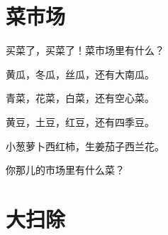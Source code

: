 \documentclass[12pt,UTF-8,openany]{ctexbook}
\begin{document}
\hanzibox{}\hanzibox{}\hanzibox{}\hanzibox{}\hspace{1em}\hanzibox{}\hanzibox{}\hanzibox{}\hanzibox{}






\chapter{菜市场}

\begin{large}
    
    买菜了，买菜了！菜市场里有什么？
    
    黄瓜，冬瓜，丝瓜，还有大南瓜。
    
    青菜，花菜，白菜，还有空心菜。
    
    黄豆，土豆，红豆，还有四季豆。
    
    小葱萝卜西红柿，生姜茄子西兰花。
    
    你那儿的市场里有什么菜？
    
\end{large}


\clearpage

\begin{center}
    
    
\end{center}


\hanzibox{}\hanzibox{}\hanzibox{}\hanzibox{}\hspace{1em}\hanzibox{}\hanzibox{}\hanzibox{}\hanzibox{}

\hanzibox{}\hanzibox{}\hanzibox{}\hanzibox{}\hspace{1em}\hanzibox{}\hanzibox{}\hanzibox{}\hanzibox{}

\hanzibox{}\hanzibox{}\hanzibox{}\hanzibox{}\hspace{1em}\hanzibox{}\hanzibox{}\hanzibox{}\hanzibox{}

\hanzibox{}\hanzibox{}\hanzibox{}\hanzibox{}\hspace{1em}\hanzibox{}\hanzibox{}\hanzibox{}\hanzibox{}






\chapter{大扫除}
\end{document}
